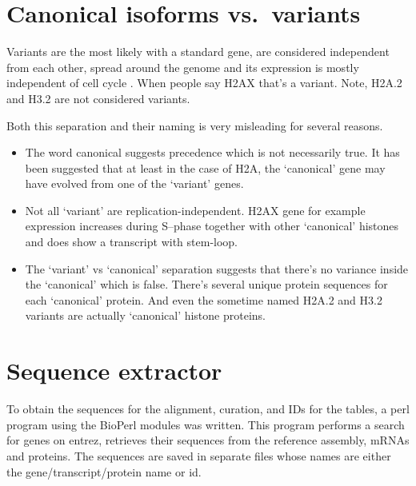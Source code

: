 \documentclass[10pt,a4paper,twocolumn,article]{memoir}
\newcommand{\addref}[1][]{\todo[color=red!40,size=\tiny]{Add reference: #1}}
\begin{document}
  \section{Canonical isoforms vs.~variants}

    Variants are the most likely with a standard gene, are considered independent from each other,
    spread around the genome and its expression is mostly independent of cell cycle . When people say H2AX that's
    a variant. Note, H2A.2 and H3.2 are not considered variants.

    Both this separation and their naming is very misleading 
    for several reasons.
    \begin{itemize}
      \item The word canonical suggests precedence which is not necessarily true. It has been
            suggested that at least in the case of H2A, the `canonical' gene may have evolved
            from one of the `variant' genes\addref.
      \item Not all `variant' are replication-independent. H2AX gene for example expression
            increases during S--phase together with other `canonical' histones and does show
            a transcript with stem-loop.
      \item The `variant' vs `canonical' separation suggests that there's no variance inside
            the `canonical' which is false. There's several unique protein sequences for each
            `canonical' protein. And even the sometime named H2A.2 and H3.2 variants are actually
            `canonical' histone proteins.
    \end{itemize}

  \section{Sequence extractor}
    To obtain the sequences for the alignment, curation, and IDs for the tables, a perl program using the
    BioPerl modules was written. This program performs a search for genes on entrez, retrieves
    their sequences from the reference assembly, mRNAs and proteins. The sequences are saved in separate files whose
    names are either the gene/transcript/protein name or id.
\end{document}

